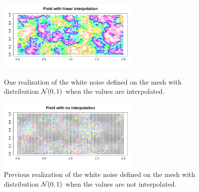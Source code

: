 \begin{figure}[H]
  \begin{minipage}{9cm}
    \begin{center}
      \includegraphics[width=7cm]{Figures/Field_interp.png}
      \caption{One realization of the white noise defined on the mesh with distribution ${\mathcal N}(0, 1)$ when the values are interpolated.}
      \label{WNMeshRealInterpolate}
    \end{center}
  \end{minipage}
  \hfill
  \begin{minipage}{9cm}
    \begin{center}
      \includegraphics[width=7cm]{Figures/Field_nointerp.png}
      \caption{Previous realization of the white noise defined on the mesh with distribution ${\mathcal N}(0, 1)$ when the values are not interpolated.}
      \label{WNMeshRealNotInterpolate}
    \end{center}
  \end{minipage}
\end{figure}
